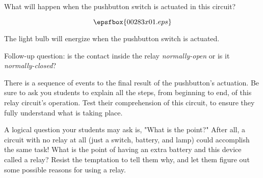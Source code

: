 

What will happen when the pushbutton switch is actuated in this circuit?

$$\epsfbox{00283x01.eps}$$







The light bulb will energize when the pushbutton switch is actuated.

\vskip 10pt

Follow-up question: is the contact inside the relay {\it normally-open} or is it {\it normally-closed}?







There is a sequence of events to the final result of the pushbutton's actuation.  Be sure to ask you students to explain all the steps, from beginning to end, of this relay circuit's operation.  Test their comprehension of this circuit, to ensure they fully understand what is taking place.

A logical question your students may ask is, "What is the point?"  After all, a circuit with no relay at all (just a switch, battery, and lamp) could accomplish the same task!  What is the point of having an extra battery and this device called a relay?  Resist the temptation to tell them why, and let them figure out some possible reasons for using a relay.




